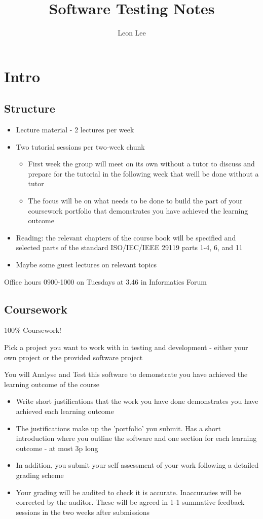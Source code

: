 \documentclass{article}
\title{Software Testing Notes}
\author{Leon Lee}
\begin{document}
\maketitle
\newpage
\tableofcontents
\newpage

\section{Intro}
\subsection{Structure}
\begin{itemize}
    \item Lecture material - 2 lectures per week
    \item Two tutorial sessions per two-week chunk
        \begin{itemize}
            \item First week the group will meet on its own without a tutor to discuss and prepare for the tutorial in the following week that weill be done without a tutor
            \item The focus will be on what needs to be done to build the part of your coursework portfolio that demonstrates you have achieved the learning outcome
        \end{itemize}
    \item Reading: the relevant chapters of the course book will be specified and selected parts of the standard ISO/IEC/IEEE 29119 parts 1-4, 6, and 11
    \item Maybe some guest lectures on relevant topics
\end{itemize}

Office hours 0900-1000 on Tuesdays at 3.46 in Informatics Forum

\subsection{Coursework}
100\% Coursework!

Pick a project you want to work with in testing and development - either your own project or the provided software project

You will Analyse and Test this software to demonstrate you have achieved the learning outcome of the course

\begin{itemize}
    \item Write short justifications that the work you have done demonstrates you have achieved each learning outcome
    \item The justifications make up the 'portfolio' you submit. Has a short introduction where you outline the software and one section for each learning outcome - at most 3p long
    \item In addition, you submit your self assessment of your work following a detailed grading scheme
    \item Your grading will be audited to check it is accurate. Inaccuracies will be corrected by the auditor. These will be agreed in 1-1 summative feedback sessions in the two weeks after submissions
\end{itemize}
\end{document}

